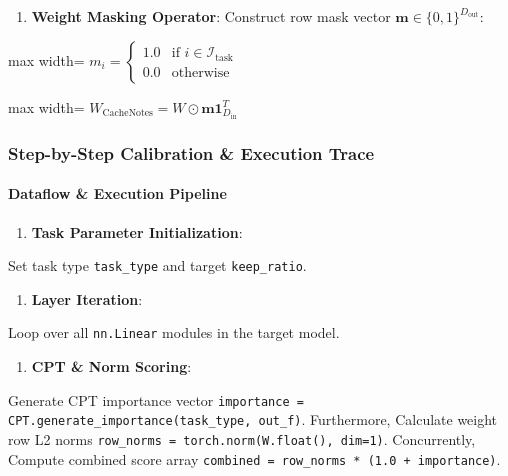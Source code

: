 \begin{enumerate}
\item \textbf{Weight Masking Operator}:
Construct row mask vector $\mathbf{m} \in \{0, 1\}^{D_{\text{out}}}$:
\end{enumerate}
\begin{center}
\begin{adjustbox}{max width=\columnwidth}
$\displaystyle
m_i = \begin{cases} 1.0 & \text{if } i \in \mathcal{I}_{\text{task}} \\ 0.0 & \text{otherwise} \end{cases}
$
\end{adjustbox}
\end{center}
\begin{center}
\begin{adjustbox}{max width=\columnwidth}
$\displaystyle
W_{\text{CacheNotes}} = W \odot \mathbf{m} \mathbf{1}_{D_{\text{in}}}^T
$
\end{adjustbox}
\end{center}


\subsubsection*{Step-by-Step Calibration \& Execution Trace}

\paragraph{Dataflow \& Execution Pipeline}

\begin{enumerate}
\item \textbf{Task Parameter Initialization}:
\end{enumerate}
Set task type \texttt{task\_type} and target \texttt{keep\_ratio}.

\begin{enumerate}
\item \textbf{Layer Iteration}:
\end{enumerate}
Loop over all \texttt{nn.Linear} modules in the target model.

\begin{enumerate}
\item \textbf{CPT \& Norm Scoring}:
\end{enumerate}
Generate CPT importance vector \texttt{importance = CPT.generate\_importance(task\_type, out\_f)}. Furthermore, Calculate weight row L2 norms \texttt{row\_norms = torch.norm(W.float(), dim=1)}. Concurrently, Compute combined score array \texttt{combined = row\_norms * (1.0 + importance)}.

